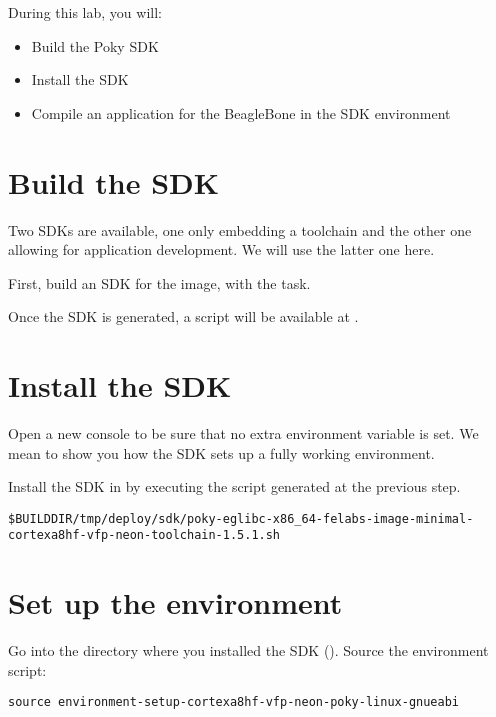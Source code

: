 
During this lab, you will:
\begin{itemize}
  \item Build the Poky SDK
  \item Install the SDK
  \item Compile an application for the BeagleBone in the SDK
    environment
\end{itemize}

\section{Build the SDK}

Two SDKs are available, one only embedding a toolchain and the
other one allowing for application development. We will use the latter one
here.

First, build an SDK for the  image, with
the  task.

Once the SDK is generated, a script will be available at
.

\section{Install the SDK}

Open a new console to be sure that no extra environment variable is set.
We mean to show you how the SDK sets up a fully working environment.

Install the SDK in  by executing the script
generated at the previous step.

{\footnotesize
\begin{verbatim}
$BUILDDIR/tmp/deploy/sdk/poky-eglibc-x86_64-felabs-image-minimal-cortexa8hf-vfp-neon-toolchain-1.5.1.sh
\end{verbatim}
}

\section{Set up the environment}

Go into the directory where you installed the SDK
(). Source the environment script:
\begin{verbatim}
source environment-setup-cortexa8hf-vfp-neon-poky-linux-gnueabi
\end{verbatim}

